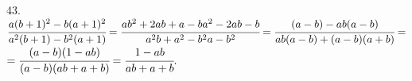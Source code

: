 43. $\cfrac{a(b+1)^2-b(a+1)^2}{a^2(b+1)-b^2(a+1)}=\cfrac{ab^2+2ab+a-ba^2-2ab-b}{a^2b+a^2-b^2a-b^2}=\cfrac{(a-b)-ab(a-b)}{ab(a-b)+(a-b)(a+b)}=$\\$=
\cfrac{(a-b)(1-ab)}{(a-b)(ab+a+b)}=\cfrac{1-ab}{ab+a+b}.$\\
